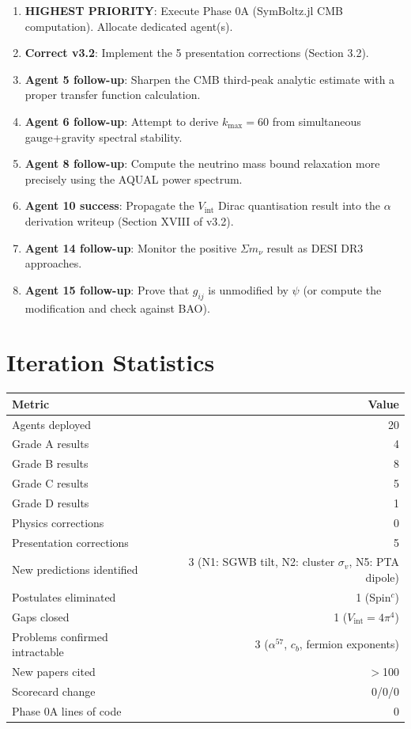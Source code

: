 \documentclass[11pt,a4paper]{article}
\begin{document}
\begin{enumerate}
\item \textbf{HIGHEST PRIORITY}: Execute Phase 0A (SymBoltz.jl CMB computation). Allocate dedicated agent(s).
\item \textbf{Correct v3.2}: Implement the 5 presentation corrections (Section 3.2).
\item \textbf{Agent 5 follow-up}: Sharpen the CMB third-peak analytic estimate with a proper transfer function calculation.
\item \textbf{Agent 6 follow-up}: Attempt to derive $k_{\max} = 60$ from simultaneous gauge+gravity spectral stability.
\item \textbf{Agent 8 follow-up}: Compute the neutrino mass bound relaxation more precisely using the AQUAL power spectrum.
\item \textbf{Agent 10 success}: Propagate the $V_{\mathrm{int}}$ Dirac quantisation result into the $\alpha$ derivation writeup (Section XVIII of v3.2).
\item \textbf{Agent 14 follow-up}: Monitor the positive $\Sigma m_\nu$ result as DESI DR3 approaches.
\item \textbf{Agent 15 follow-up}: Prove that $g_{ij}$ is unmodified by $\psi$ (or compute the modification and check against BAO).
\end{enumerate}


\section{Iteration Statistics}

\begin{center}
\begin{tabular}{lr}
\toprule
\textbf{Metric} & \textbf{Value} \\
\midrule
Agents deployed & 20 \\
Grade A results & 4 \\
Grade B results & 8 \\
Grade C results & 5 \\
Grade D results & 1 \\
Physics corrections & 0 \\
Presentation corrections & 5 \\
New predictions identified & 3 (N1: SGWB tilt, N2: cluster $\sigma_v$, N5: PTA dipole) \\
Postulates eliminated & 1 (Spin$^c$) \\
Gaps closed & 1 ($V_{\mathrm{int}} = 4\pi^4$) \\
Problems confirmed intractable & 3 ($\alpha^{57}$, $c_b$, fermion exponents) \\
New papers cited & $>$100 \\
Scorecard change & 0/0/0 \\
Phase 0A lines of code & 0 \\
\bottomrule
\end{tabular}
\end{center}
\end{document}

